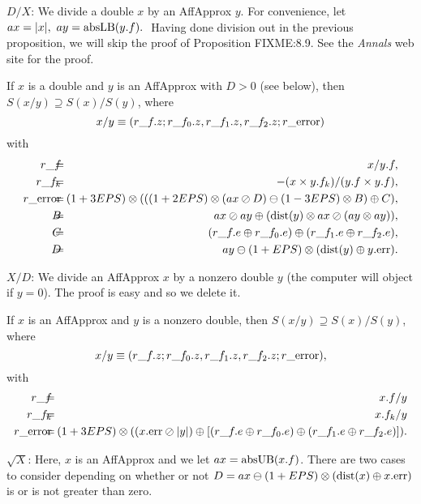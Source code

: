 $D/X$:
We   divide a double $x$ by an AffApprox $y$.
For convenience, let $ax = |x|,\ ay = {\rm absLB}(y.f).\ $  Having done division out in the previous proposition, we will skip the proof of Proposition FIXME:8.9.  See the {\it Annals}
web site for the proof.

 If $x$ is a double and $y$ is an 
{\rm AffApprox}  with $D > 0$ {\rm (}\/see below{\rm ),}
 then $S(x / y) \supseteq S(x) / S(y)${\rm ,} where
$$x / y \equiv (r\_f.z; r\_f_0.z, r\_f_1.z, r\_f_2.z; r\_{\rm error})$$
with
 \begin{eqnarray*}
r\_f&\hskip-8pt =\hskip-8pt& x / y.f,\\
r\_f_k&\hskip-8pt =\hskip-8pt& -(x \times y.f_k)/ (y.f \times y.f),\\
r\_{\rm error}&\hskip-8pt =\hskip-8pt& (1+3EPS) \otimes ( 
((1 + 2EPS) \otimes (ax  \oslash D) \ominus (1 - 3EPS) \otimes B)
\oplus C),\\
 B&\hskip-8pt =\hskip-8pt& ax \oslash ay  \oplus ({\rm dist}(y) \otimes ax \oslash (ay \otimes ay)),\\
C& \hskip-8pt=\hskip-8pt& (r\_f.e \oplus r\_f_0.e)
\oplus (r\_f_1.e \oplus r\_f_2.e),\\
D &\hskip-8pt=\hskip-8pt& ay \ominus (1 + EPS) \otimes ({\rm dist}(y) \oplus y.{\rm err}).
\end{eqnarray*}
\endproclaim

$X/D$:
We   divide an AffApprox $x$ by a nonzero double $y$ (the computer will object if $y = 0$).  The proof is easy  and
so we delete it.

If $x$ is an {\rm AffApprox}  and $y$ is a nonzero double{\rm ,} then
$S(x / y) \supseteq S(x) / S(y)${\rm ,} where
$$x / y \equiv (r\_f.z; r\_f_0.z, r\_f_1.z, r\_f_2.z; r\_{\rm error}),$$
with
\begin{eqnarray*}
r\_f &\hskip-8pt=\hskip-8pt& x.f / y\\
r\_f_k &\hskip-8pt=\hskip-8pt& x.f_k / y\\
r\_{\rm error} &\hskip-8pt = \hskip-8pt&
(1+3EPS) \otimes ( 
(x.{\rm err}\oslash |y|)
\oplus 
[(r\_f.e \oplus r\_f_0.e) \oplus (r\_f_1.e \oplus r\_f_2.e)]
                                               ).\end{eqnarray*}
\endproclaim

$\sqrt X$: 
Here, $x$ is an AffApprox and we let $ax = {\rm absUB}(x.f)$.  There are two cases to consider depending on whether or not
$D = ax \ominus (1 + EPS) \otimes ({\rm dist}(x) \oplus x.{\rm err})$ is or is not greater than zero.

